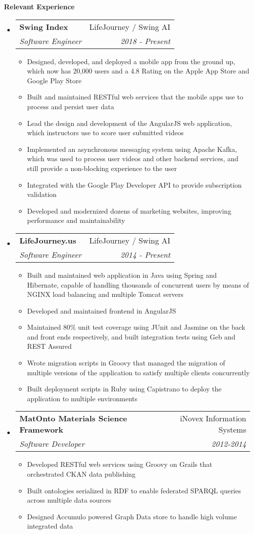 \documentclass[letterpaper,11pt]{article}
\makeatletter
\newcommand{\resitem}[1]{\item #1 \vspace{-2pt}}
\newcommand{\resheading}[1]{{\large \colorbox{mygrey}{\begin{minipage}{\textwidth}{\textbf{#1 \vphantom{p\^{E}}}}\end{minipage}}}}
\newcommand{\ressubheading}[4]{
    \begin{tabular*}{7.0in}{l@{\extracolsep{\fill}}r}
        \textbf{#1} & #2 \\
        \textit{#3} & \textit{#4} \\
    \end{tabular*}\vspace{-6pt}}
\makeatother
\begin{document}
    \resheading{Relevant Experience}
    \begin{itemize}
        \item
        \ressubheading{Swing Index}{LifeJourney / Swing AI}{Software Engineer}{2018 - Present}
        \begin{itemize}
            \resitem{Designed, developed, and deployed a mobile app from the ground up, which now has 20,000 users and a 4.8 Rating on the Apple App Store and Google Play Store}
            \resitem{Built and maintained RESTful web services that the mobile apps use to process and persist user data}
            \resitem{Lead the design and development of the AngularJS web application, which instructors use to score user submitted videos}
            \resitem{Implemented an asynchronous messaging system using Apache Kafka, which was used to process user videos and other backend services, and still provide a non-blocking experience to the user}
            \resitem{Integrated with the Google Play Developer API to provide subscription validation}
            \resitem{Developed and modernized dozens of marketing websites, improving performance and maintainability}
        \end{itemize}

        \item
        \ressubheading{LifeJourney.us}{LifeJourney / Swing AI}{Software Engineer}{2014 - Present}
        \begin{itemize}
            \resitem{Built and maintained web application in Java using Spring and Hibernate, capable of handling thousands of concurrent users by means of NGINX load balancing and multiple Tomcat servers}
            \resitem{Developed and maintained frontend in AngularJS}
            \resitem{Maintained 80\% unit test coverage using JUnit and Jasmine on the back and front ends respectively, and built integration tests using Geb and REST Assured}
            \resitem{Wrote migration scripts in Groovy that managed the migration of multiple versions of the application to satisfy multiple clients concurrently}
            \resitem{Built deployment scripts in Ruby using Capistrano to deploy the application to multiple environments}
        \end{itemize}

        \item
        \ressubheading{MatOnto Materials Science Framework}{iNovex Information Systems}{Software Developer}{2012-2014}
        \begin{itemize}
            \resitem{Developed RESTful web services using Groovy on Grails that orchestrated CKAN data publishing}
            \resitem{Built ontologies serialized in RDF to enable federated SPARQL queries across multiple data sources}
            \resitem{Designed Accumulo powered Graph Data store to handle high volume integrated data}
        \end{itemize}

    \end{itemize}
\end{document}
